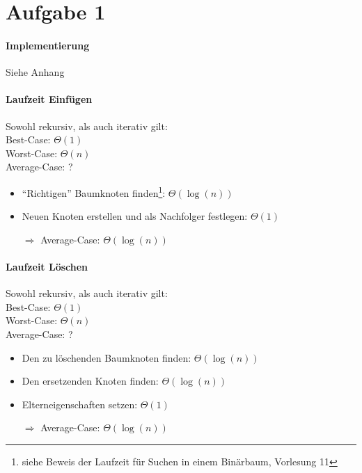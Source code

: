 \section*{Aufgabe 1}
\paragraph{Implementierung} Siehe Anhang

\paragraph{Laufzeit Einfügen} Sowohl rekursiv, als auch iterativ gilt: \\
    Best-Case: $\Theta(1)$ \\
    Worst-Case: $\Theta(n)$ \\
    Average-Case: ?

    \begin{itemize}[noitemsep]
        \item \enquote{Richtigen} Baumknoten finden\footnote{siehe Beweis der Laufzeit für Suchen in einem Binärbaum, Vorlesung 11}: $\Theta(\log(n))$
        \item Neuen Knoten erstellen und als Nachfolger festlegen: $\Theta(1)$
        \item[$\Rightarrow$] Average-Case: $\Theta(\log(n))$
    \end{itemize}

\paragraph{Laufzeit Löschen} Sowohl rekursiv, als auch iterativ gilt: \\
    Best-Case: $\Theta(1)$ \\
    Worst-Case: $\Theta(n)$ \\
    Average-Case: ?

    \begin{itemize}[noitemsep]
        \item Den zu löschenden Baumknoten finden\footnotemark[1]: $\Theta(\log(n))$
        \item Den ersetzenden Knoten finden\footnotemark[1]: $\Theta(\log(n))$
        \item Elterneigenschaften setzen: $\Theta(1)$
        \item[$\Rightarrow$] Average-Case: $\Theta(\log(n))$
    \end{itemize}